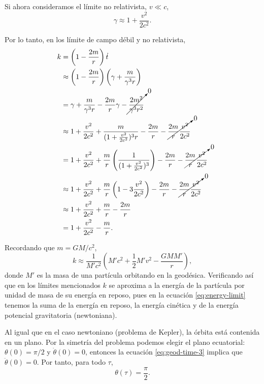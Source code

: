 \documentclass[letterpaper,11pt]{article}
\begin{document}
Si ahora consideramos el límite no relativista, $v \ll c$, 
\begin{equation}
\gamma \approx 1 + \frac{v^2}{2c^2}.
\end{equation}

Por lo tanto, en los límite de campo débil y no relativista,
\begin{align}
k &= \left(1 - \frac{2m}{r} \right) \dot{t} \\
&\approx  \left(1 - \frac{2m}{r} \right) \left(\gamma + \frac{m}{\gamma^3 r} \right) \\
&=  \gamma + \frac{m}{\gamma^3r} - \frac{2m}{r} \gamma - \cancelto{0}{\frac{2m^2}{\gamma^3 r^2}} \\
&\approx 1 + \frac{v^2}{2c^2} + \frac{m}{(1 + \frac{v^2}{2c^2})^3 r} - \frac{2m}{r} - \cancelto{0}{\frac{2m}{r} \frac{v^2}{2c^2}} \\
&= 1 + \frac{v^2}{2c^2} + \frac{m}{r} \left( \frac{1}{(1 + \frac{v^2}{2c^2})^3} \right) - \frac{2m}{r} - \cancelto{0}{\frac{2m}{r} \frac{v^2}{2c^2}}  \\
&\approx 1 + \frac{v^2}{2c^2} + \frac{m}{r} \left( 1 - 3 \frac{v^2}{2c^2} \right) - \frac{2m}{r} - \cancelto{0}{\frac{2m}{r} \frac{v^2}{2c^2}} \\
&\approx 1 + \frac{v^2}{2c^2} + \frac{m}{r} - \frac{2m}{r} \\
&= 1 + \frac{v^2}{2c^2} - \frac{m}{r}.
\end{align}

Recordando que $m = GM/c^2$,
\begin{equation} \label{eq:energy-limit}
k \approx \frac{1}{M'c^2}\left( M'c^2 + \frac{1}{2} M' v^2 - \frac{GM M'}{r} \right),
\end{equation}
donde $M'$ es la masa de una partícula orbitando en la geodésica. Verificando así que en los límites mencionados $k$ se aproxima a la energía de la partícula por unidad de masa de su energía en reposo, pues en la ecuación \eqref{eq:energy-limit} tenemos la suma de la energía en reposo, la energía cinética y de la energía potencial gravitatoria (newtoniana).


Al igual que en el caso newtoniano (problema de Kepler), la órbita está contenida en un plano. Por la simetría del problema podemos elegir el plano ecuatorial: $\theta(0) = \pi/2$ y $\dot{\theta}(0) = 0$, entonces la ecuación \eqref{eq:geod-time-3} implica que $\ddot{\theta}(0) = 0$. Por tanto, para todo $\tau$,
\begin{equation} \label{eq:theta-sol}
\theta(\tau) = \frac{\pi}{2}.
\end{equation}
\end{document}
